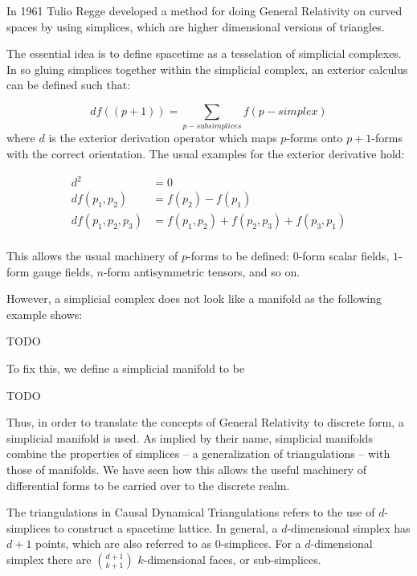 \documentclass[12pt]{article}
\begin{document}
In 1961 Tulio Regge developed a method for doing General Relativity on curved spaces by using simplices, which are higher dimensional versions of triangles. \cite{regge}

The essential idea is to define spacetime as a tesselation of simplicial complexes. In so gluing simplices together within the simplicial complex, an exterior calculus can be defined such that: \cite{david_simplicial_1993}

\begin{equation}
df((p+1))=\sum_{p-subsimplices}f(p-simplex)
\end{equation}
where $d$ is the exterior derivation operator which maps $p$-forms onto $p+1$-forms with the correct orientation. The usual examples for the exterior derivative hold:

\begin{equation}
\begin{aligned}
d^2&=0\\
df(p_1,p_2)&=f(p_2)-f(p_1)\\
df(p_1,p_2,p_3)&=f(p_1,p_2)+f(p_2,p_3)+f(p_3,p_1)\\
\end{aligned}
\end{equation}

This allows the usual machinery of $p$-forms to be defined: $0$-form scalar fields, $1$-form gauge fields, $n$-form antisymmetric tensors, and so on.

However, a simplicial complex does not look like a manifold as the following example shows:

TODO

To fix this, we define a simplicial manifold to be 

TODO

Thus, in order to translate the concepts of General Relativity to discrete form, a simplicial manifold is used. As implied by their name, simplicial manifolds combine the properties of simplices -- a generalization of triangulations -- with those of manifolds. We have seen how this allows the useful machinery of differential forms to be carried over to the discrete realm.

The triangulations in Causal Dynamical Triangulations refers to the use of $d$-simplices to construct a spacetime lattice. In general, a $d$-dimensional simplex has $d+1$ points, which are also referred to as $0$-simplices. For a $d$-dimensional simplex there are $\binom{d+1}{k+1}$ $k$-dimensional faces, or sub-simplices.
\end{document}
